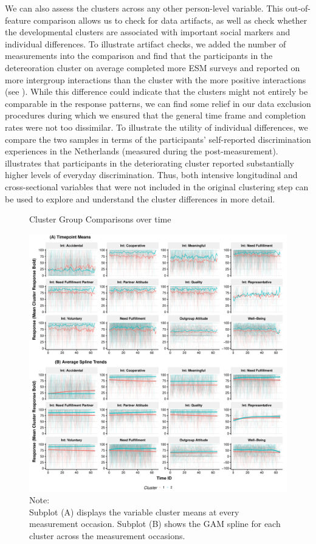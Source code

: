\Question{\textcolor{cyan}{Talk about early warning signals here? E.g., divergences in means over time could be invesitigated with targeted studies.}}

We can also assess the clusters across any other person-level variable.
This out-of-feature comparison allows us to check for data artifacts, as
well as check whether the developmental clusters are associated with
important social markers and individual differences. To illustrate
artifact checks, we added the number of measurements into the comparison
and find that the participants in the detereoration cluster on average
completed more ESM surveys and reported on more intergroup interactions
than the cluster with the more positive interactions (see
). While this difference could indicate that
the clusters might not entirely be comparable in the response patterns,
we can find some relief in our data exclusion procedures during which we
ensured that the general time frame and completion rates were not too
dissimilar. To illustrate the utility of individual differences, we
compare the two samples in terms of the participants' self-reported
discrimination experiences in the Netherlands (measured during the
post-measurement).  illustrates that
participants in the deteriorating cluster reported substantially higher
levels of everyday discrimination. Thus, both intensive longitudinal and
cross-sectional variables that were not included in the original
clustering step can be used to explore and understand the cluster
differences in more detail.

\begin{figure}[!ht] %
  \caption{Cluster Group Comparisons over time}
  \label{fig:clusterTs}
  \centering\includegraphics[width=\textwidth]{figures/clusterTsComb.pdf}
  \caption*{Note: \\
  Subplot (A) displays the variable cluster means at every measurement occasion. Subplot (B) shows the GAM spline for each cluster across the measurement occasions.}
\end{figure}
